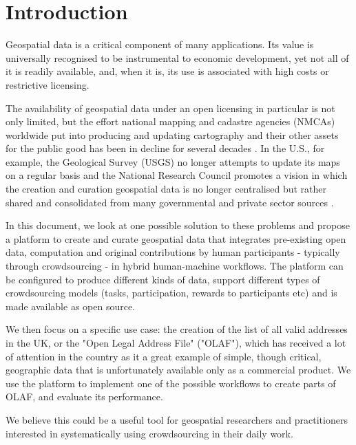 \section{Introduction}

Geospatial data is a critical component of many applications. Its value is universally recognised to be instrumental to economic development, yet not all of it is readily available, and, when it is, its use is associated with high costs or restrictive licensing. 

The availability of geospatial data under an open licensing in particular is not only limited, but the effort national mapping and cadastre agencies (NMCAs) worldwide put into producing and updating cartography and their other assets for the public good has been in decline for several decades \cite{ESTES:1994vz}. In the U.S., for example, the Geological Survey (USGS) no longer attempts to update its maps on a regular basis and the National Research Council promotes a vision in which the creation and curation geospatial data is no longer centralised but rather shared and consolidated from many governmental and private sector sources \cite{Committee:1993vp}.

In this document, we look at one possible solution to these problems and propose a platform to create and curate geospatial data that integrates pre-existing open data, computation and original contributions by human participants - typically through crowdsourcing - in hybrid human-machine workflows. The platform can be configured to produce different kinds of data, support different types of crowdsourcing models (tasks, participation, rewards to participants etc) and is made available as open source.

We then focus on a specific use case: the creation of the list of all valid addresses in the UK, or the "Open Legal Address File" ("OLAF"), which has received a lot of attention in the country as it a great example of simple, though critical, geographic data that is unfortunately available only as a commercial product. We use the platform to implement one of the possible workflows to create parts of OLAF, and evaluate its performance. 

We believe this could be a useful tool for geospatial researchers and practitioners interested in systematically using crowdsourcing in their daily work.
